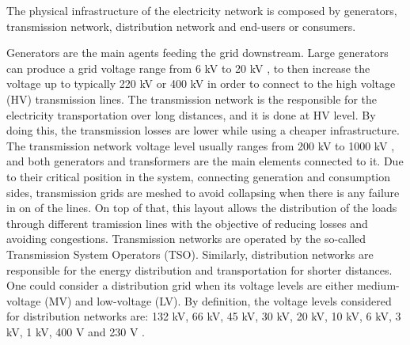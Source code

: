 The physical infrastructure of the electricity network is composed by generators, transmission network, distribution network and end-users or consumers.

%

Generators are the main agents feeding the grid downstream. Large generators can produce a grid voltage range from 6 kV to 20 kV \cite{Gomez-Exposito2008}, to then increase the voltage up to typically 220 kV or 400 kV in order to connect to the high voltage (HV) transmission lines. The transmission network is the responsible for the electricity transportation over long distances, and it is done at HV level. By doing this, the transmission losses are lower while using a cheaper infrastructure. The transmission network voltage level usually ranges from 200 kV to 1000 kV \cite{Erbach2016}, and both generators and transformers are the main elements connected to it. Due to their critical position in the system, connecting generation and consumption sides, transmission grids are meshed to avoid collapsing when there is any failure in on of the lines. On top of that, this layout allows the distribution of the loads through different tramission lines with the objective of reducing losses and avoiding congestions. Transmission networks are operated by the so-called Transmission System Operators (TSO). Similarly, distribution networks are responsible for the energy distribution and transportation for shorter distances. One could consider a distribution grid when its voltage levels are either medium-voltage (MV) and low-voltage (LV). By definition, the voltage levels considered for distribution networks are: 132 kV, 66 kV, 45 kV, 30 kV, 20 kV, 10 kV, 6 kV, 3 kV, 1 kV, 400 V and 230 V \cite{Gomez-Exposito2008, Erbach2016}. 
\newpage
